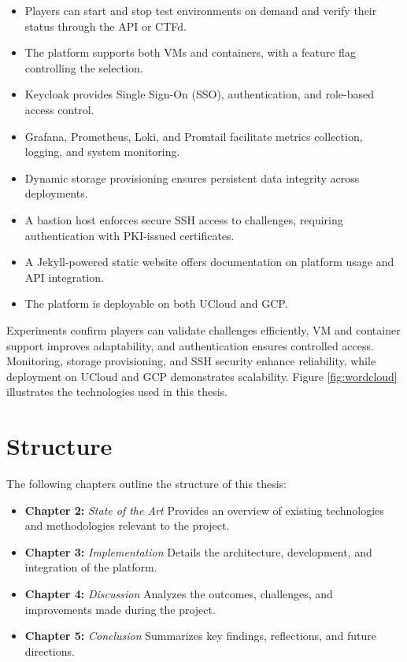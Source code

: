 \begin{itemize}
    \item Players can start and stop test environments on demand and verify their status through the API or CTFd.
    \item The platform supports both VMs and containers, with a feature flag controlling the selection.
    \item Keycloak provides Single Sign-On (SSO), authentication, and role-based access control.
    \item Grafana, Prometheus, Loki, and Promtail facilitate metrics collection, logging, and system monitoring.
    \item Dynamic storage provisioning ensures persistent data integrity across deployments.
    \item A bastion host enforces secure SSH access to challenges, requiring authentication with PKI-issued certificates.
    \item A Jekyll-powered static website offers documentation on platform usage and API integration.
    \item The platform is deployable on both UCloud and GCP.
\end{itemize}

Experiments confirm players can validate challenges efficiently, VM and container support improves adaptability, and authentication ensures controlled access. Monitoring, storage provisioning, and SSH security enhance reliability, while deployment on UCloud and GCP demonstrates scalability. Figure \ref{fig:wordcloud} illustrates the technologies used in this thesis.

\section{Structure} 
The following chapters outline the structure of this thesis:
\begin{itemize}
    \item \textbf{Chapter 2:} \textit{State of the Art} Provides an overview of existing technologies and methodologies relevant to the project.
    \item \textbf{Chapter 3:} \textit{Implementation} Details the architecture, development, and integration of the platform.
    \item \textbf{Chapter 4:} \textit{Discussion} Analyzes the outcomes, challenges, and improvements made during the project.
    \item \textbf{Chapter 5:} \textit{Conclusion} Summarizes key findings, reflections, and future directions.
\end{itemize}

